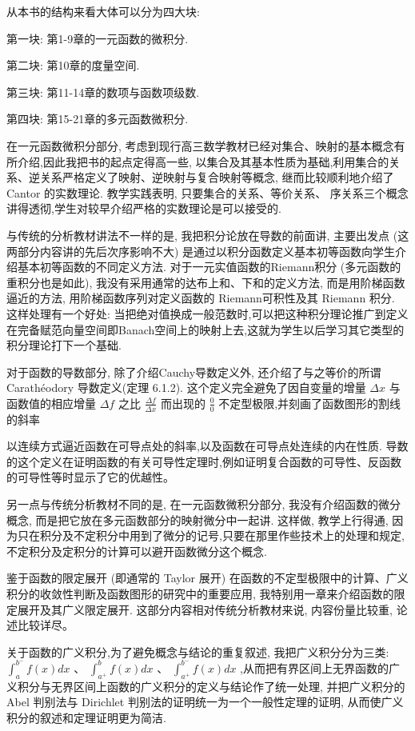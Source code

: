 从本书的结构来看大体可以分为四大块:

第一块: 第1-9章的一元函数的微积分.

第二块: 第10章的度量空间.

第三块: 第11-14章的数项与函数项级数.

第四块: 第15-21章的多元函数微积分.

在一元函数微积分部分, 考虑到现行高三数学教材已经对集合、映射的基本概念有所介绍,因此我把书的起点定得高一些, 以集合及其基本性质为基础,利用集合的关系、逆关系严格定义了映射、逆映射与复合映射等概念, 继而比较顺利地介绍了 Cantor 的实数理论. 教学实践表明, 只要集合的关系、等价关系、 序关系三个概念讲得透彻,学生对较早介绍严格的实数理论是可以接受的.

与传统的分析教材讲法不一样的是, 我把积分论放在导数的前面讲, 主要出发点 (这两部分内容讲的先后次序影响不大) 是通过以积分函数定义基本初等函数向学生介绍基本初等函数的不同定义方法. 对于一元实值函数的Riemann积分 (多元函数的重积分也是如此), 我没有采用通常的达布上和、下和的定义方法, 而是用阶梯函数逼近的方法, 用阶梯函数序列对定义函数的 Riemann可积性及其 Riemann 积分. 这样处理有一个好处: 当把绝对值换成一般范数时,可以把这种积分理论推广到定义在完备赋范向量空间即Banach空间上的映射上去,这就为学生以后学习其它类型的积分理论打下一个基础.

对于函数的导数部分, 除了介绍Cauchy导数定义外, 还介绍了与之等价的所谓Carathéodory 导数定义(定理 6.1.2). 这个定义完全避免了因自变量的增量 \({\Delta x}\) 与函数值的相应增量 \({\Delta f}\) 之比 \(\frac{\Delta f}{\Delta x}\) 而出现的 \(\frac{0}{0}\) 不定型极限,并刻画了函数图形的割线的斜率

以连续方式逼近函数在可导点处的斜率,以及函数在可导点处连续的内在性质. 导数的这个定义在证明函数的有关可导性定理时,例如证明复合函数的可导性、反函数的可导性等时显示了它的优越性。

另一点与传统分析教材不同的是, 在一元函数微积分部分, 我没有介绍函数的微分概念, 而是把它放在多元函数部分的映射微分中一起讲. 这样做, 教学上行得通, 因为只在积分及不定积分中用到了微分的记号,只要在那里作些技术上的处理和规定, 不定积分及定积分的计算可以避开函数微分这个概念.

鉴于函数的限定展开 (即通常的 Taylor 展开) 在函数的不定型极限中的计算、广义积分的收敛性判断及函数图形的研究中的重要应用, 我特别用一章来介绍函数的限定展开及其广义限定展开. 这部分内容相对传统分析教材来说, 内容份量比较重, 论述比较详尽。

关于函数的广义积分,为了避免概念与结论的重复叙述, 我把广义积分分为三类: \({\int }_{a}^{{b}^{ - }}f\left( x\right) {dx}\) 、 \({\int }_{{a}^{ + }}^{b}f\left( x\right) {dx}\) 、 \({\int }_{{a}^{ + }}^{{b}^{ - }}f\left( x\right) {dx}\) ,从而把有界区间上无界函数的广义积分与无界区间上函数的广义积分的定义与结论作了统一处理, 并把广义积分的 Abel 判别法与 Dirichlet 判别法的证明统一为一个一般性定理的证明, 从而使广义积分的叙述和定理证明更为简洁.

